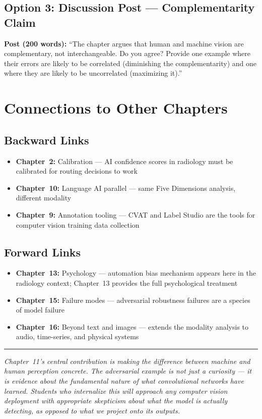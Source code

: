 \subsection{Option 3: Discussion Post --- Complementarity Claim}

\textbf{Post (200 words):} ``The chapter argues that human and machine vision are complementary, not interchangeable. Do you agree? Provide one example where their errors are likely to be correlated (diminishing the complementarity) and one where they are likely to be uncorrelated (maximizing it).''

\section{Connections to Other Chapters}

\subsection{Backward Links}
\begin{itemize}
    \item \textbf{Chapter~2:} Calibration --- AI confidence scores in radiology must be calibrated for routing decisions to work
    \item \textbf{Chapter~10:} Language AI parallel --- same Five Dimensions analysis, different modality
    \item \textbf{Chapter~9:} Annotation tooling --- CVAT and Label Studio are the tools for computer vision training data collection
\end{itemize}

\subsection{Forward Links}
\begin{itemize}
    \item \textbf{Chapter~13:} Psychology --- automation bias mechanism appears here in the radiology context; Chapter~13 provides the full psychological treatment
    \item \textbf{Chapter~15:} Failure modes --- adversarial robustness failures are a species of model failure
    \item \textbf{Chapter~16:} Beyond text and images --- extends the modality analysis to audio, time-series, and physical systems
\end{itemize}

\bigskip
\begin{center}
\rule{0.5\textwidth}{0.4pt}
\end{center}
\bigskip

\noindent\textit{Chapter~11's central contribution is making the difference between machine and human perception \emph{concrete}. The adversarial example is not just a curiosity --- it is evidence about the fundamental nature of what convolutional networks have learned. Students who internalize this will approach any computer vision deployment with appropriate skepticism about what the model is actually detecting, as opposed to what we project onto its outputs.}
